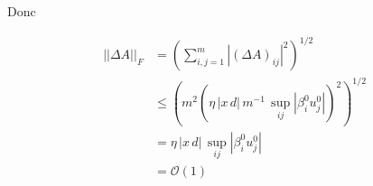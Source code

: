 \documentclass[a4paper, 11pt, french]{article}
\begin{document}
\begin{itemize}
		Donc
		
		\begin{align*}
			||\Delta A||_F &= \left( \sum_{i,j = 1}^{m} | (\Delta A)_{ij} |^2 \right)^{1/2} \\
			&\leq ( m^2 (\eta \, |x \, d| \, m^{-1} \, \sup_{ij} |\beta^0_i u^0_j|)^2 )^{1/2} \\
			&= \eta \, |x \, d| \, \sup_{ij} |\beta^0_i u^0_j| \\
			&= \mathcal{O}(1)
		\end{align*}
		
 
		\end{itemize}
	
	
\end{document}
